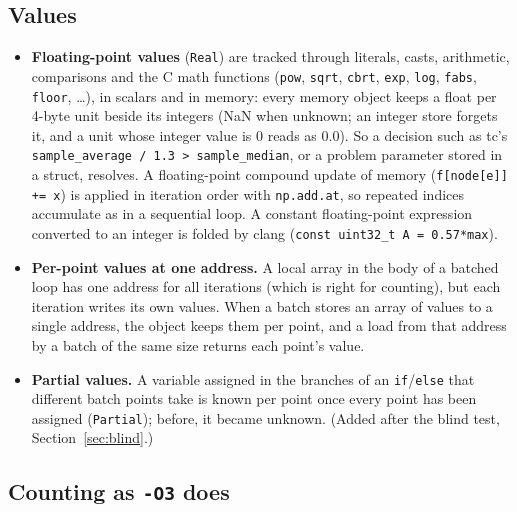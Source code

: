 \documentclass[11pt]{article}
\newcommand{\code}[1]{\texttt{#1}}
\newcommand{\secref}[1]{Section~\ref{#1}}
\begin{document}
\subsection{Values}
\label{sec:cpp-values}
\begin{itemize}
\item \textbf{Floating-point values} (\code{Real}) are tracked through literals, casts, arithmetic, comparisons and
the C math functions (\code{pow}, \code{sqrt}, \code{cbrt}, \code{exp}, \code{log}, \code{fabs}, \code{floor},
\dots), in scalars and in memory: every memory object keeps a float per 4-byte unit beside its integers (NaN when
unknown; an integer store forgets it, and a unit whose integer value is 0 reads as 0.0). So a decision such as tc's
\code{sample\_average / 1.3 > sample\_median}, or a problem parameter stored in a struct, resolves. A floating-point
compound update of memory (\code{f[node[e]] += x}) is applied in iteration order with \code{np.add.at}, so repeated
indices accumulate as in a sequential loop. A constant floating-point expression converted to an integer is folded
by clang (\code{const uint32\_t A = 0.57*max}).
\item \textbf{Per-point values at one address.} A local array in the body of a batched loop has one address for all
iterations (which is right for counting), but each iteration writes its own values. When a batch stores an array of
values to a single address, the object keeps them per point, and a load from that address by a batch of the same
size returns each point's value.
\item \textbf{Partial values.} A variable assigned in the branches of an \code{if}/\code{else} that different batch
points take is known per point once every point has been assigned (\code{Partial}); before, it became unknown. (Added
after the blind test, \secref{sec:blind}.)
\end{itemize}

\subsection{Counting as \code{-O3} does}
\end{document}
